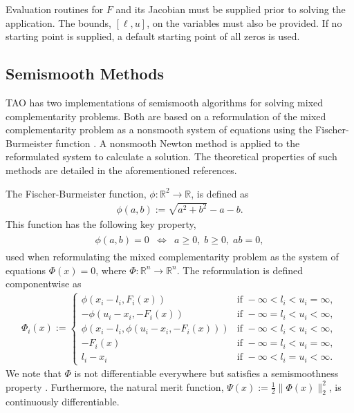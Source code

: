 \documentclass[]{book}
\newcommand{\R}{\mathbb R}
\renewcommand{\Re}{\R}
\begin{document}
Evaluation routines for $F$ and its Jacobian must be supplied prior
to solving the application.
The bounds, $[\ell,u]$, on the variables must also be 
provided.  
If no starting point is supplied, a default starting point of all zeros 
is used.

\subsection{Semismooth Methods}

TAO has two implementations of semismooth algorithms 
\cite{munson.facchinei.ea:semismooth, deluca.facchinei.ea:semismooth, 
facchinei.fischer.ea:semismooth} for solving mixed complementarity problems.
Both are based on a reformulation of the mixed complementarity problem
as a nonsmooth system of equations using the Fischer-Burmeister 
function \cite{fischer:special}.  A nonsmooth Newton method is applied to
the reformulated system to calculate a solution.  The theoretical properties
of such methods are detailed in the aforementioned references.

The Fischer-Burmeister function, $\phi:\Re^2 \to \Re$, is defined as
\begin{eqnarray*}
\phi(a,b) := \sqrt{a^2 + b^2} - a - b.
\end{eqnarray*}
This function has the following key property,
\begin{eqnarray*}
\begin{array}{lcr}
        \phi(a,b) = 0 & \Leftrightarrow & a \geq 0,\; b \geq 0,\; ab = 0,
\end{array}
\end{eqnarray*}
used when reformulating the mixed complementarity problem as the system of 
equations $\Phi(x) = 0$, where $\Phi:\Re^n \to \Re^n$.  
The reformulation is defined componentwise as
\begin{eqnarray*}
\Phi_i(x) := \left\{ \begin{array}{ll}
   \phi(x_i - l_i, F_i(x)) & \mbox{if } -\infty < l_i < u_i = \infty, \\
   -\phi(u_i-x_i, -F_i(x)) & \mbox{if } -\infty = l_i < u_i < \infty, \\
   \phi(x_i - l_i, \phi(u_i - x_i, - F_i(x))) & \mbox{if } -\infty < l_i < u_i < \infty, \\
   -F_i(x) & \mbox{if } -\infty = l_i < u_i = \infty, \\
   l_i - x_i & \mbox{if } -\infty < l_i = u_i < \infty.
   \end{array} \right.
\end{eqnarray*}
We note that $\Phi$ is not differentiable everywhere but satisfies a
semismoothness property 
\cite{mifflin:semismooth, qi:convergence, qi.sun:nonsmooth}.  Furthermore,
the natural merit function, $\Psi(x) := \frac{1}{2} \| \Phi(x) \|_2^2$, is 
continuously differentiable.
\end{document}
